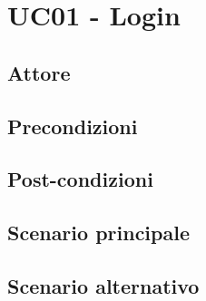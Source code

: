 \section{UC01 - Login}


\subsection{Attore}
\subsection{Precondizioni}
\subsection{Post-condizioni}
\subsection{Scenario principale}
\subsection{Scenario alternativo}